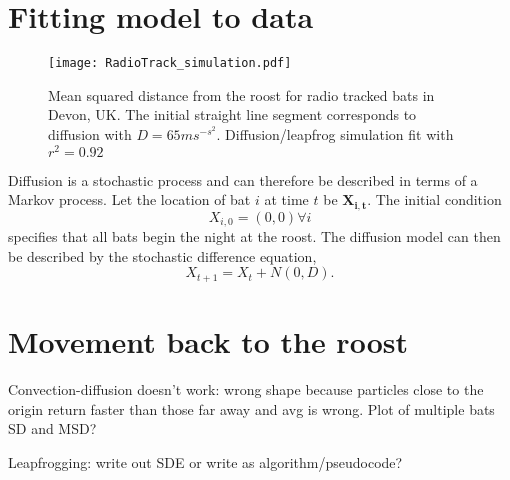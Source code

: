 \section{Fitting model to data}



\begin{figure} [h]
    \centering
        \texttt{[image: RadioTrack\_simulation.pdf]}
        \caption{Mean squared distance from the roost for radio tracked bats in Devon, UK. The initial straight line segment corresponds to diffusion with $D = 65 ms^{-s^2}$. Diffusion/leapfrog simulation fit with $r^2 = 0.92$}
    \label{fig:radiotrack_fit}
\end{figure}

Diffusion is a stochastic process and can therefore be described in terms of a Markov process. Let the location of bat $i$ at time $t$ be $\bm{X_{i,t}}$. The initial condition
%
\begin{equation}
X_{i,0} = (0,0)         \forall i
\end{equation}
%
specifies that all bats begin the night at the roost. The diffusion model can then be described by the stochastic difference equation,
%
\begin{equation}
X_{t+1} = X_t + N(0,D) .
\end{equation}



\section{Movement back to the roost}

Convection-diffusion doesn't work: wrong shape because particles close to the origin return faster than those far away and avg is wrong.
Plot of multiple bats SD and MSD?

Leapfrogging: write out SDE or write as algorithm/pseudocode?
